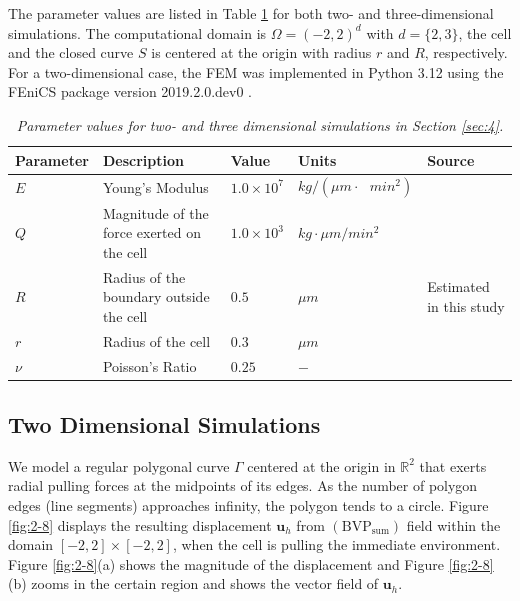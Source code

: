 \documentclass[pdflatex,sn-mathphys-num]{sn-jnl}
\newtheorem*{lemma star}{Lemma}
\begin{document}
The parameter values are listed in Table \ref{Table:para_2D} for both two- and three-dimensional simulations. The computational domain is $\Omega = (-2,2)^d$ with $d=\{2, 3\}$, the cell and the closed curve $S$ is centered at the origin with radius $r$ and $R$, respectively. For a two-dimensional case, the FEM was implemented in Python 3.12 using the FEniCS package version 2019.2.0.dev0 \citep{FEniCS}.

\begin{table}[h!]\footnotesize
\centering
\caption{\it Parameter values for two- and three dimensional simulations in Section \ref{sec:4}.}
\label{Table:para_2D}
\begin{tabular}{lllll}
\hline
Parameter & Description & Value & Units & Source \\ \hline
$E$ & Young's Modulus & $1.0\times 10^{7}$ & $kg/(\mu m \cdot\text{ }min^{2})$ & \citet{Peng_Cancer_2023} \\ 
$Q$ & Magnitude of the force exerted on the cell & $1.0\times 10^{3}$ & $%
kg \cdot\mu m/min^{2}$ &  \citet{Peng_Cancer_2023} \\ 
$R$ & Radius of the boundary outside the cell & $0.5$ & $\mu m$ & Estimated in this study \\ 
$r$ & Radius of the cell & $0.3$ & $\mu m$ & \citet{Chen_2017} \\ 
$\nu $ & Poisson's Ratio & $0.25$ & $-$ &  \citet{Peng_Cancer_2023}\\ \hline
\hline
\end{tabular}
\end{table}


\subsection{Two Dimensional Simulations}
We model a regular polygonal curve $\Gamma$ centered at the origin in $\mathbb{R}^2$ that exerts radial pulling forces at the midpoints of its edges. As the number of polygon edges (line segments) approaches infinity, the polygon tends to a circle. %
Figure \ref{fig:2-8} displays the resulting displacement $\boldsymbol{u}_h$ from $\mathrm{(BVP_{sum})}$ field within the domain $[-2,2] \times [-2,2]$, when the cell is pulling the immediate environment. Figure \ref{fig:2-8}(a) shows the magnitude of the displacement and Figure \ref{fig:2-8}(b) zooms in the certain region and shows the vector field of $\boldsymbol{u}_h$. 
\end{document}
